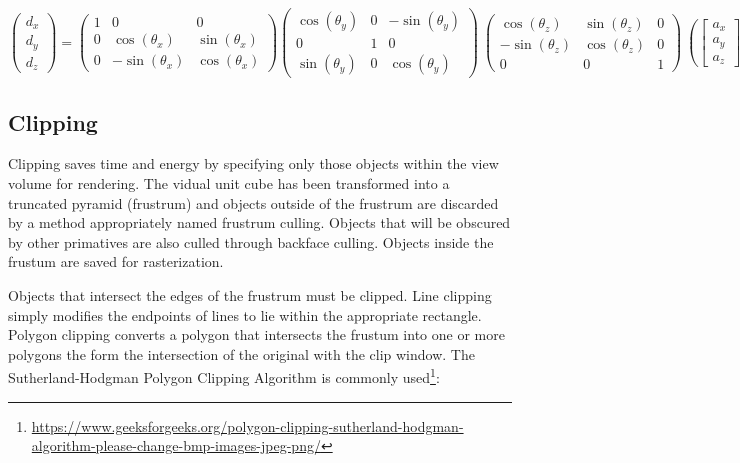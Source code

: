 \documentclass{article}
\begin{document}
\[\begin{pmatrix}
  d_{x} \\
  d_{y} \\
  d_{z} 
 \end{pmatrix}
=
\begin{pmatrix}
  1 & 0 & 0 \\
  0 & \cos(\theta_{x}) & \sin(\theta_{x}) \\
  0 &  -\sin(\theta_{x}) & \cos(\theta_{x}) 
 \end{pmatrix}
\begin{pmatrix}
  \cos(\theta_{y}) & 0 & -\sin(\theta_{y}) \\
  0 & 1 & 0 \\
  \sin(\theta_{y}) & 0  & \cos(\theta_{y}) 
 \end{pmatrix}\
\begin{pmatrix}
  \cos(\theta_{z}) & \sin(\theta_{z})  & 0  \\
  -\sin(\theta_{z}) & \cos(\theta_{z}) & 0 \\
  0 & 0  & 1 
 \end{pmatrix}\
\left(
\begin{bmatrix}
  a_{x} \\
  a_{y} \\
  a_{z} 
\end{bmatrix}\
-
\begin{bmatrix}
  c_{x} \\
  c_{y} \\
  c_{z} 
\end{bmatrix}\
\right)\]

\subsection{Clipping}
Clipping saves time and energy by specifying only those objects within the view volume for rendering. The vidual unit cube has been transformed into a truncated pyramid (frustrum) and objects outside of the frustrum are discarded by a method appropriately named frustrum culling. Objects that will be obscured by other primatives are also culled through backface culling. Objects inside the frustum are saved for rasterization.

Objects that intersect the edges of the frustrum must be clipped. Line clipping simply modifies the endpoints of lines to lie within the appropriate rectangle. Polygon clipping converts a polygon that intersects the frustum into one or more polygons the form the intersection of the original with the clip window. The Sutherland-Hodgman Polygon Clipping Algorithm is commonly used\footnote{\url{https://www.geeksforgeeks.org/polygon-clipping-sutherland-hodgman-algorithm-please-change-bmp-images-jpeg-png/}}:
\end{document}
